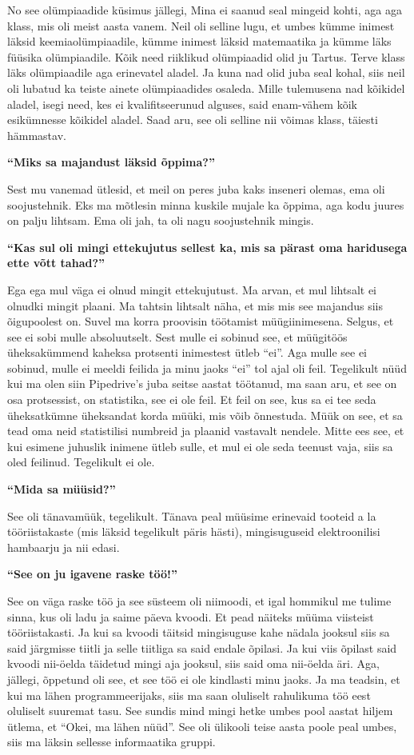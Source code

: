 No see olümpiaadide küsimus jällegi, Mina ei saanud seal mingeid kohti, aga aga klass, mis oli meist aasta vanem.
Neil oli selline lugu, et umbes kümme inimest läksid keemiaolümpiaadile, kümme inimest läksid matemaatika ja kümme läks füüsika olümpiaadile. Kõik need riiklikud olümpiaadid olid ju Tartus. Terve klass läks olümpiaadile aga erinevatel aladel. Ja kuna nad olid juba seal kohal, siis neil oli lubatud  ka teiste ainete olümpiaadides osaleda. Mille tulemusena nad kõikidel aladel, isegi need, kes ei kvalifitseerunud alguses, said enam-vähem kõik esikümnesse kõikidel aladel. Saad aru, see oli selline nii võimas klass, täiesti hämmastav.

\textbf{\enquote{Miks sa majandust läksid õppima?}}

Sest mu vanemad ütlesid, et meil on peres juba kaks inseneri olemas, ema oli soojustehnik. Eks ma mõtlesin minna kuskile mujale ka õppima, aga  kodu juures on palju lihtsam. Ema oli jah, ta oli nagu soojustehnik mingis.

\textbf{\enquote{Kas sul oli mingi ettekujutus sellest ka, mis sa pärast oma haridusega ette võtt tahad?}}

Ega ega mul väga ei olnud mingit ettekujutust. Ma arvan, et mul lihtsalt ei olnudki mingit plaani. Ma tahtsin lihtsalt näha, et mis mis see majandus siis õigupoolest on. Suvel ma korra proovisin töötamist müügiinimesena. Selgus, et see ei sobi mulle absoluutselt. Sest mulle ei sobinud see, et müügitöös üheksakümmend kaheksa protsenti inimestest ütleb \enquote{ei}. Aga mulle see ei sobinud, mulle ei meeldi feilida ja minu jaoks \enquote{ei} tol ajal oli feil. Tegelikult nüüd kui ma olen siin Pipedrive's juba seitse aastat töötanud, ma saan aru, et see on osa protsessist, on statistika, see ei ole feil. Et feil on see, kus sa ei tee seda üheksatkümne üheksandat korda müüki, mis võib õnnestuda. Müük on see, et sa tead oma neid statistilisi numbreid ja plaanid vastavalt nendele. Mitte ees see, et kui esimene juhuslik inimene ütleb sulle, et mul ei ole seda teenust vaja, siis sa oled feilinud. Tegelikult ei ole.

\textbf{\enquote{Mida sa müüsid?}}

See oli tänavamüük, tegelikult. Tänava peal müüsime erinevaid tooteid a la tööriistakaste (mis läksid tegelikult päris hästi), mingisuguseid elektroonilisi hambaarju ja nii edasi.

\textbf{\enquote{See on ju igavene raske töö!}}

See on väga raske töö ja  see süsteem oli niimoodi, et igal hommikul me tulime sinna, kus oli ladu ja saime päeva kvoodi. Et pead näiteks müüma viisteist tööriistakasti. Ja kui sa kvoodi täitsid mingisuguse kahe nädala jooksul siis sa said järgmisse tiitli ja selle tiitliga sa said endale õpilasi. Ja kui viis õpilast said kvoodi nii-öelda täidetud mingi aja jooksul, siis said oma nii-öelda äri. Aga, jällegi, õppetund oli see, et see töö ei ole kindlasti minu jaoks. Ja ma teadsin, et kui ma lähen programmeerijaks, siis ma saan oluliselt rahulikuma töö eest oluliselt suuremat tasu. See sundis mind mingi hetke umbes pool aastat hiljem ütlema, et \enquote{Okei, ma lähen nüüd}. See oli ülikooli teise aasta poole peal umbes, siis ma läksin sellesse informaatika gruppi.

